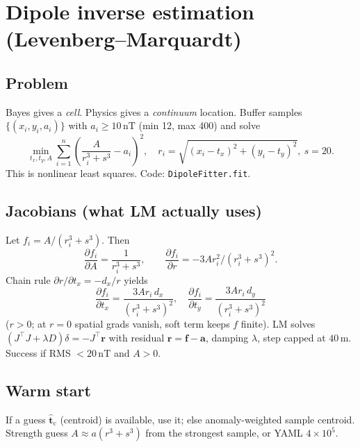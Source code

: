 \documentclass[11pt,a4paper]{article}
\begin{document}
\section{Dipole inverse estimation (Levenberg--Marquardt)}
\label{sec:dipole}

\subsection{Problem}
Bayes gives a \emph{cell}. Physics gives a \emph{continuum} location. Buffer
samples \(\{(x_i,y_i,a_i)\}\) with \(a_i\ge 10\,\mathrm{nT}\) (min 12, max 400)
and solve
\begin{equation}
\label{eq:ls}
\min_{t_x,t_y,A}
\sum_{i=1}^{n}
\left(
\frac{A}{r_i^{3}+s^{3}}-a_i
\right)^{2},
\quad r_i=\sqrt{(x_i-t_x)^{2}+(y_i-t_y)^{2}},\ s=20.
\end{equation}
This is nonlinear least squares. Code: \texttt{DipoleFitter.fit}.

\subsection{Jacobians (what LM actually uses)}
Let \(f_i=A/(r_i^{3}+s^{3})\). Then
\[
\frac{\partial f_i}{\partial A}=\frac{1}{r_i^{3}+s^{3}},
\qquad
\frac{\partial f_i}{\partial r}=-3A r_i^{2}/(r_i^{3}+s^{3})^{2}.
\]
Chain rule \(\partial r/\partial t_x=-d_x/r\) yields
\[
\frac{\partial f_i}{\partial t_x}
=\frac{3A r_i\, d_x}{(r_i^{3}+s^{3})^{2}},
\quad
\frac{\partial f_i}{\partial t_y}
=\frac{3A r_i\, d_y}{(r_i^{3}+s^{3})^{2}}
\]
(\(r>0\); at \(r=0\) spatial grads vanish, soft term keeps \(f\) finite).
LM solves \((J^{\top}J+\lambda D)\delta=-J^{\top}\mathbf{r}\) with residual
\(\mathbf{r}=\mathbf{f}-\mathbf{a}\), damping \(\lambda\), step capped at
\(40\,\mathrm{m}\). Success if RMS \(<20\,\mathrm{nT}\) and \(A>0\).

\subsection{Warm start}
If a guess \(\hat{\mathbf{t}}_{\mathrm{c}}\) (centroid) is available, use it;
else anomaly-weighted sample centroid. Strength guess \(A\approx a(r^{3}+s^{3})\)
from the strongest sample, or YAML \(4\times10^{5}\).
\end{document}
